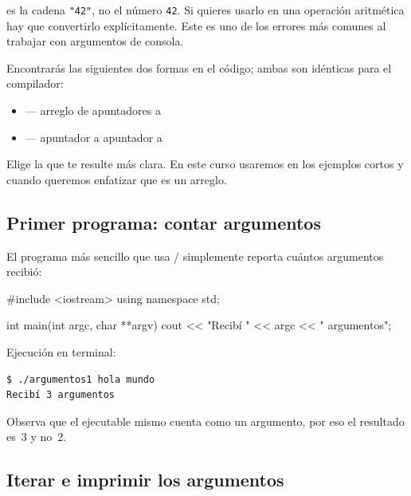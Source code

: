 \documentclass[12pt, oneside]{article}
\begin{document}
\begin{advertencia}
   es la cadena \texttt{"42"}, no el número \texttt{42}.
  Si quieres usarlo en una operación aritmética hay que convertirlo
  explícitamente.  Este es uno de los errores más comunes al trabajar
  con argumentos de consola.
\end{advertencia}

\begin{recuerda}
  Encontrarás las siguientes dos formas en el código; ambas son
  idénticas para el compilador:
  \begin{itemize}
    \item {} — arreglo de apuntadores a 
    \item {} — apuntador a apuntador a 
  \end{itemize}
  Elige la que te resulte más clara.  En este curso usaremos
   en los ejemplos cortos y 
  cuando queremos enfatizar que es un arreglo.
\end{recuerda}

\subsection{Primer programa: contar argumentos}

El programa más sencillo que usa / simplemente
reporta cuántos argumentos recibió:

\begin{codigo}[caption=argumentos1.cpp]
#include <iostream>
using namespace std;

int main(int argc, char **argv){
    cout << "Recibí " << argc << " argumentos\n";
}
\end{codigo}

Ejecución en terminal:
\begin{verbatim}
$ ./argumentos1 hola mundo
Recibí 3 argumentos
\end{verbatim}

Observa que el ejecutable mismo cuenta como un argumento, por eso el
resultado es~3 y no~2.

\subsection{Iterar e imprimir los argumentos}
\end{document}
